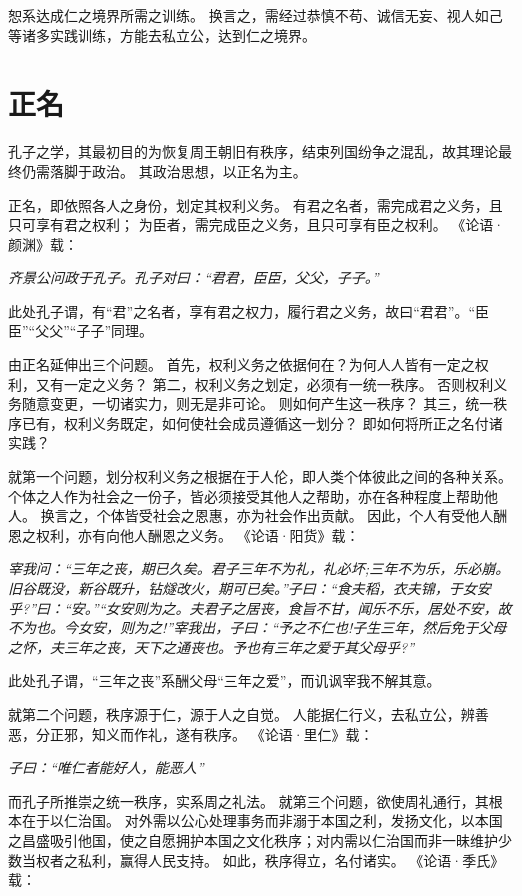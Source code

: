 \documentclass[11pt]{article}
\begin{document}
恕系达成仁之境界所需之训练。
换言之，需经过恭慎不苟、诚信无妄、视人如己等诸多实践训练，方能去私立公，达到仁之境界。

\section{正名}
孔子之学，其最初目的为恢复周王朝旧有秩序，结束列国纷争之混乱，故其理论最终仍需落脚于政治。
其政治思想，以正名为主。

\par

正名，即依照各人之身份，划定其权利义务。
有君之名者，需完成君之义务，且只可享有君之权利；
为臣者，需完成臣之义务，且只可享有臣之权利。
《论语·颜渊》载：

\textit{齐景公问政于孔子。孔子对曰：“君君，臣臣，父父，子子。”}

此处孔子谓，有“君”之名者，享有君之权力，履行君之义务，故曰“君君”。“臣臣”“父父”“子子”同理。

\par

由正名延伸出三个问题。
首先，权利义务之依据何在？为何人人皆有一定之权利，又有一定之义务？
第二，权利义务之划定，必须有一统一秩序。
否则权利义务随意变更，一切诸实力，则无是非可论。
则如何产生这一秩序？
其三，统一秩序已有，权利义务既定，如何使社会成员遵循这一划分？
即如何将所正之名付诸实践？

\par

就第一个问题，划分权利义务之根据在于人伦，即人类个体彼此之间的各种关系。
个体之人作为社会之一份子，皆必须接受其他人之帮助，亦在各种程度上帮助他人。
换言之，个体皆受社会之恩惠，亦为社会作出贡献。
因此，个人有受他人酬恩之权利，亦有向他人酬恩之义务。
《论语·阳货》载：

\textit{宰我问：“三年之丧，期已久矣。君子三年不为礼，礼必坏;三年不为乐，乐必崩。旧谷既没，新谷既升，钻燧改火，期可已矣。”子曰：“食夫稻，衣夫锦，于女安乎?”曰：“安。”“女安则为之。夫君子之居丧，食旨不甘，闻乐不乐，居处不安，故不为也。今女安，则为之!”宰我出，子曰：“予之不仁也!子生三年，然后免于父母之怀，夫三年之丧，天下之通丧也。予也有三年之爱于其父母乎?”}

此处孔子谓，“三年之丧”系酬父母“三年之爱”，而讥讽宰我不解其意。

就第二个问题，秩序源于仁，源于人之自觉。
人能据仁行义，去私立公，辨善恶，分正邪，知义而作礼，遂有秩序。
《论语·里仁》载：

\textit{子曰：“唯仁者能好人，能恶人”}

而孔子所推崇之统一秩序，实系周之礼法。
就第三个问题，欲使周礼通行，其根本在于以仁治国。
对外需以公心处理事务而非溺于本国之利，发扬文化，以本国之昌盛吸引他国，使之自愿拥护本国之文化秩序；对内需以仁治国而非一昧维护少数当权者之私利，赢得人民支持。
如此，秩序得立，名付诸实。
《论语·季氏》载：
\end{document}
